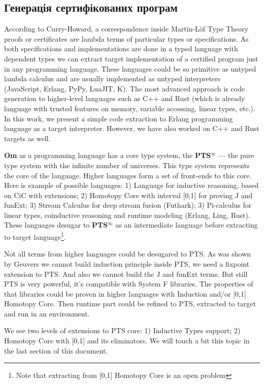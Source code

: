 \begin{definition}
\begin{definition}
\begin{definition}
\begin{definition}
\subsection{Генерація сертифікованих програм}
According to Curry-Howard, a correspondence inside Martin-Löf Type Theory\cite{Lof84} proofs or certificates are lambda terms of particular types or specifications.
As both specifications and implementations are done in a typed language with dependent types we can extract target implementation of a certified program just in any programming language.
These languages could be so primitive as untyped lambda calculus and are usually implemented as untyped interpreters (JavaScript, Erlang, PyPy, LuaJIT, K).
The most advanced approach is code generation to higher-level languages such as C++ and Rust (which is already language with trusted features on memory, variable accessing, linear types, etc.).
In this work, we present a simple code extraction to Erlang programming language as a target interpreter.
However, we have also worked on C++ and Rust targets as well.

{\bf Om} as a programming language has a core type system, the {\bf PTS$^{\infty}$} --- the pure type system with the infinite number of universes.
This type system represents the core of the language.
Higher languages form a set of front-ends to this core.
 Here is example of possible languages:
1) Language for inductive reasoning, based on CiC with extensions;
2) Homotopy Core with interval [0,1] for proving J and funExt;
3) Stream Calculus for deep stream fusion (Futhark);
3) Pi-calculus for linear types, coinductive reasoning and runtime modeling (Erlang, Ling, Rust).
These languages desugar to {\bf PTS$^{\infty}$} as an intermediate language before extracting to target language\footnote{Note that extracting from [0,1] Homotopy Core is an open problem}.

Not all terms from higher languages could be desugared to PTS.
As was shown by Geuvers\cite{Geuvers01} we cannot build induction principle inside PTS, we need a fixpoint extension to PTS.
And also we cannot build the J and funExt terms.
But still PTS is very powerful, it's compatible with System F libraries.
The properties of that libraries could be proven in higher languages with Induction and/or [0,1] Homotopy Core.
Then runtime part could be refined to PTS, extracted to target and run in an environment.

We see two levels of extensions to PTS core: 1) Inductive Types support; 2) Homotopy Core with [0,1] and its eliminators.
We will touch a bit this topic in the last section of this document.


\end{definition}
\end{definition}
\end{definition}
\end{definition}
